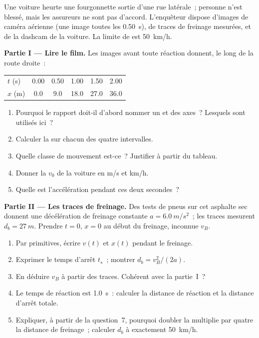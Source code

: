 \begin{problem}
\label{pb:g12:kinematics-2d:1}
Une voiture heurte une fourgonnette sortie d'une rue latérale~;
personne n'est blessé, mais les assureurs ne sont pas d'accord.
L'enquêteur dispose d'images de caméra aérienne (une image toutes les
\qty{0.50}{s}), de traces de freinage mesurées, et de la dashcam de la
voiture. La limite de  est \qty{50}{km/h}.

\medskip
\noindent\textbf{Partie I --- Lire le film.}
Les images avant toute réaction donnent, le long de la route droite~:
\begin{center}\small
\begin{tabular}{lccccc}
$t$ (\unit{s}) & 0.00 & 0.50 & 1.00 & 1.50 & 2.00\\
$x$ (\unit{m}) & 0.0 & 9.0 & 18.0 & 27.0 & 36.0
\end{tabular}
\end{center}
\begin{enumerate}
  \item Pourquoi le rapport doit-il d'abord nommer un  et des
        axes~? Lesquels sont utilisés ici~?
  \item Calculer la  sur chacun des quatre intervalles.
  \item Quelle classe de mouvement est-ce~? Justifier à partir du
        tableau.
  \item Donner la  $v_0$ de la voiture en \unit{m/s} et
        \unit{km/h}.
  \item Quelle est l'accélération pendant ces deux secondes~?
\end{enumerate}

\medskip
\noindent\textbf{Partie II --- Les traces de freinage.}
Des tests de pneus sur cet asphalte sec donnent une décélération de
freinage constante $a = \qty{6.0}{m/s^2}$~; les traces mesurent
$d_b = \qty{27}{m}$. Prendre $t = 0$, $x = 0$ au début du freinage,
 inconnue $v_B$.
\begin{enumerate}[resume]
  \item Par primitives, écrire $v(t)$ et $x(t)$ pendant le freinage.
  \item Exprimer le temps d'arrêt $t_s$~; montrer
        $d_b = v_B^2/(2a)$.
  \item En déduire $v_B$ à partir des traces. Cohérent avec la
        partie~I~?
  \item Le temps de réaction est \qty{1.0}{s}~: calculer la distance de
        réaction et la distance d'arrêt totale.
  \item Expliquer, à partir de la question~7, pourquoi doubler la
         multiplie par quatre la distance de freinage~;
        calculer $d_b$ à exactement \qty{50}{km/h}.
\end{enumerate}


\end{problem}
